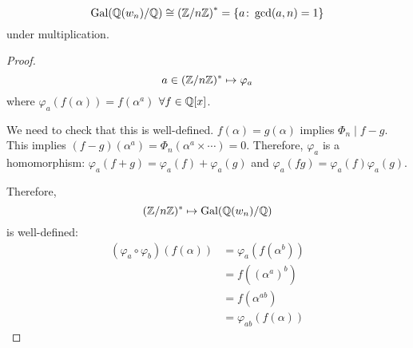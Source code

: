 \documentclass[a4paper,twoside,master.tex]{subfiles}
\begin{document}
\begin{claim}
    \begin{equation}
        \text{Gal}(\mathbb{Q}(w_n) / \mathbb{Q}) \cong \left( \mathbb{Z}/n\mathbb{Z} \right)^* = \{a\colon \gcd(a ,n) = 1\}
    \end{equation}
    under multiplication.
\end{claim}
\begin{proof}
    \begin{equation}
        a \in (\mathbb{Z}/n\mathbb{Z})^* \mapsto \varphi_a
    \end{equation}
    where $ \varphi_a(f(\alpha)) = f(\alpha^a) $ $ \forall f \in \mathbb{Q}[x] $. 

    We need to check that this is well-defined. $ f(\alpha) = g(\alpha) $ implies $ \Phi_n \mid f-g $. This implies $ (f-g)(\alpha^a) = \Phi_n(\alpha^a \times \cdots) = 0 $. Therefore, $ \varphi_a $ is a homomorphism: $ \varphi_a(f+g) = \varphi_a(f) + \varphi_a(g) $ and $ \varphi_a(fg) = \varphi_a(f) \varphi_a(g) $.

    Therefore,
    \begin{equation}
        (\mathbb{Z}/n\mathbb{Z})^* \mapsto \text{Gal}(\mathbb{Q}(w_n) / \mathbb{Q})
    \end{equation}
    is well-defined:
    \begin{align}
        (\varphi_a \circ \varphi_b)(f(\alpha)) &= \varphi_a(f(\alpha^b)) \\
                                               &= f( (\alpha^a)^b)\\
                                               &= f(\alpha^{ab}) \\
                                               &= \varphi_{ab}(f(\alpha))
    \end{align}
\end{proof}
\end{document}
